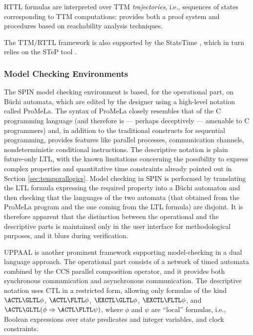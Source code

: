 RTTL formulas are interpreted over TTM \emph{trajectories}, i.e., sequences of states
corresponding to TTM computations: \cite{Ost89} provides both a proof system and  procedures based 
on reachability analysis techniques.

The TTM/RTTL framework is also supported by the StateTime  \cite{Ost97},
which in turn relies on the STeP tool \cite{BBCFMSU00}.


\subsubsection*{Model Checking Environments}
The SPIN model checking environment \cite{Hol03} is based, for the 
operational part, on B\"uchi automata, which are edited by the 
designer using a high-level notation called ProMeLa. The syntax 
of ProMeLa closely resembles that of the C programming language 
(and therefore is --- perhaps deceptively --- amenable to C programmers) 
and, in addition to the traditional constructs for sequential 
programming, provides features like parallel processes, communication 
channels, nondeterministic conditional instructions. The descriptive 
notation is plain future-only LTL, with the known limitations 
concerning the possibility to express complex properties and 
quantitative time constraints already pointed out in Section \ref{sec:temporallogics}. 
Model checking in SPIN is performed by translating the LTL formula 
expressing the required property into a B\"uchi automaton and 
then checking that the languages of the two automata (that obtained 
from the ProMeLa program and the one coming from the LTL formula) 
are disjoint. It is therefore apparent that the distinction between 
the operational and the descriptive parts is maintained only 
in the user interface for methodological purposes, and it blurs 
during verification.

UPPAAL \cite{LPY97} is another prominent framework supporting model-checking 
in a dual language approach. The operational part consists of 
a network of timed automata combined by the CCS parallel composition 
operator, and it provides both synchronous communication and 
asynchronous communication. The descriptive notation uses CTL 
in a restricted form, allowing only formulas of the kind $\ACTL \GLTL \phi$,
$\ACTL \FLTL \phi$, $\EXCTL \GLTL \phi$, $\EXCTL \FLTL \phi$, and $\ACTL \GLTL (\phi \Rightarrow \ACTL \FLTL \psi)$,
where $\phi$ and $\psi$ are ``local'' formulas, i.e., Boolean expressions 
over state predicates and integer variables, and clock constraints.


